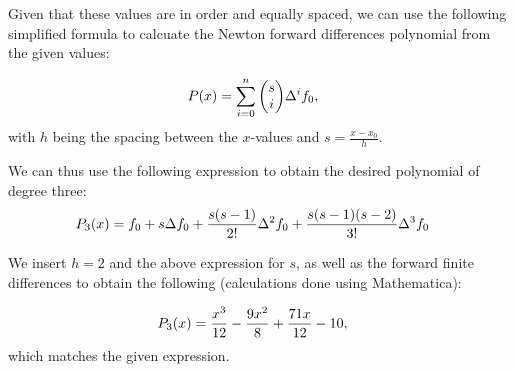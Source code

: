 \documentclass[12pt]{article}
\DeclarePairedDelimiter\rb{(}{)}
\begin{document}
Given that these values are in order and equally spaced, we can use the following simplified formula to calcuate the Newton forward differences polynomial from the given values:

\begin{align*}
	P \rb*{x} & =  \sum_{i = 0}^{n} {\begin{pmatrix}
		s\\
		i
	\end{pmatrix}} \Delta ^{i} f_{0},
\end{align*}
with \(h\) being the spacing between the \(x\)-values and \(s = \frac{x - x_{0}}{h}\).

We can thus use the following expression to obtain the desired polynomial of degree three:
\begin{align*}
	P_{3} \rb*{x} & =  f_{0} + s \Delta f_{0} + \frac{s \rb*{s - 1}}{2 !} \Delta ^{2} f_{0} + \frac{s \rb*{s-1} \rb*{s - 2}}{3!} \Delta ^{3} f_{0} &\\
\end{align*}

We insert \(h = 2\) and the above expression for \(s\), as well as the forward finite differences to obtain the following (calculations done using Mathematica):

\begin{align*}
	P_{3} \rb*{x} & = \frac{x^{3}}{12} - \frac{9 x^{2}}{8} + \frac{71 x}{12} - 10, &\\
\end{align*}
which matches the given expression. 
\end{document}
